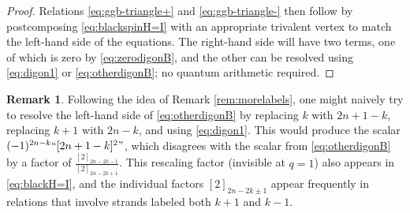 \documentclass[10pt]{amsart}
\numberwithin{equation}{section}
\theoremstyle{definition}
\newtheorem{rem}[thm]{Remark}
\begin{document}
\begin{proof}
Relations \eqref{eq:ggb-triangle+} and \eqref{eq:ggb-triangle-} 
then follow by postcomposing \eqref{eq:blackspinH=I} with an appropriate trivalent vertex to match the left-hand side of the equations. 
The right-hand side will have two terms, one of which is zero by \eqref{eq:zerodigonB}, 
and the other can be resolved using \eqref{eq:digon1} or \eqref{eq:otherdigonB}; no quantum arithmetic required.
	\end{proof}

\begin{rem} \label{rem:2nplus1minusk} 
Following the idea of Remark \ref{rem:morelabels}, 
one might naively try to resolve the left-hand side of \eqref{eq:otherdigonB} by replacing $k$ with $2n+1-k$, 
replacing $k+1$ with $2n-k$, and using \eqref{eq:digon1}. 
This would produce the scalar $(-1)^{2n-k} ``[2n+1-k]^2"$, %
which disagrees with the scalar from \eqref{eq:otherdigonB} by a factor of $\frac{[2]_{2n-2k-1}}{[2]_{2n-2k+1}}$. 
This rescaling factor (invisible at $q=1$) also appears in \eqref{eq:blackH=I}, 
and the individual factors $[2]_{2n-2k\pm 1}$ appear frequently in relations that involve strands labeled both $k+1$ and $k-1$. \end{rem}
\end{document}
